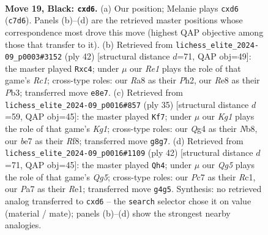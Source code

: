 \documentclass[11pt]{article}
\begin{document}
\clearpage

\begin{figure}[p]\centering
\begin{subfigure}{0.46\textwidth}\centering
\resizebox{\linewidth}{!}{%
\newchessgame
\chessboard[
  setfen={rn2r1k1/p1p1Bp1p/3P2p1/8/2Q1P1q1/8/P4P1P/R6K b - - 0 19},
  showmover=false,
  pgfstyle=straightmove, color=movearrow, markmove={c7-d6}
]}
\caption{}
\end{subfigure}\hfill
\begin{subfigure}{0.46\textwidth}\centering
\resizebox{\linewidth}{!}{%
\newchessgame
\chessboard[
  setfen={r5k1/6pp/ppp2q2/8/2bPQ3/1P2P3/P5PP/2R3K1 w - - 0 22},
  showmover=false,
  pgfstyle=straightmove, color=movearrow, markmove={c1-c4}
]}
\caption{}
\end{subfigure}
\\[4pt]
\begin{subfigure}{0.46\textwidth}\centering
\resizebox{\linewidth}{!}{%
\newchessgame
\chessboard[
  setfen={rn3rk1/pp2p3/5p1B/2pp1Q2/3P3P/2q5/P1P3P1/R4K1R b - - 0 18},
  showmover=false,
  pgfstyle=straightmove, color=movearrow, markmove={g8-f7}
]}
\caption{}
\end{subfigure}\hfill
\begin{subfigure}{0.46\textwidth}\centering
\resizebox{\linewidth}{!}{%
\newchessgame
\chessboard[
  setfen={4r1k1/5ppp/pp1r4/2p3Q1/8/1P2PP2/Pq3PK1/2R1R3 w - - 4 22},
  showmover=false,
  pgfstyle=straightmove, color=movearrow, markmove={g5-h4}
]}
\caption{}
\end{subfigure}
\caption{\textbf{Move 19, Black: \texttt{cxd6}.} (a) Our position; Melanie plays \texttt{cxd6} (\texttt{c7d6}). Panels (b)--(d) are the retrieved master positions whose correspondence most drove this move (highest QAP objective among those that transfer to it). (b) Retrieved from \texttt{lichess\_elite\_2024-09\_p0003\#3152} (ply 42) [structural distance $d$=71, QAP obj=49]: the master played \texttt{Rxc4}; under $\mu$ our \emph{Re1} plays the role of that game's \emph{Rc1}; cross-type roles: our \emph{R}a8 as their \emph{P}h2, our \emph{R}e8 as their \emph{P}b3; transferred move \texttt{e8e7}. (c) Retrieved from \texttt{lichess\_elite\_2024-09\_p0016\#857} (ply 35) [structural distance $d$=59, QAP obj=45]: the master played \texttt{Kf7}; under $\mu$ our \emph{Kg1} plays the role of that game's \emph{Kg1}; cross-type roles: our \emph{Q}g4 as their \emph{N}b8, our \emph{b}e7 as their \emph{R}f8; transferred move \texttt{g8g7}. (d) Retrieved from \texttt{lichess\_elite\_2024-09\_p0016\#1109} (ply 42) [structural distance $d$=71, QAP obj=45]: the master played \texttt{Qh4}; under $\mu$ our \emph{Qg5} plays the role of that game's \emph{Qg5}; cross-type roles: our \emph{P}c7 as their \emph{R}c1, our \emph{P}a7 as their \emph{R}e1; transferred move \texttt{g4g5}. Synthesis: no retrieved analog transferred to \texttt{cxd6} -- the \texttt{search} selector chose it on value (material / mate); panels (b)--(d) show the strongest nearby analogies.}
\label{fig:thought-m37}
\end{figure}
\end{document}
